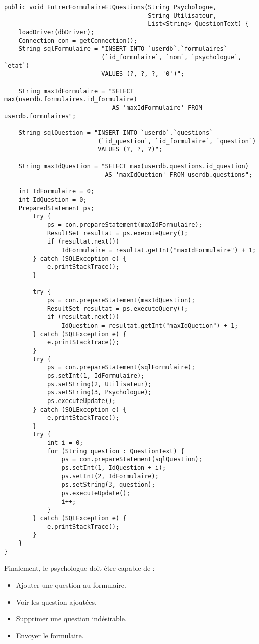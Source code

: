 \documentclass[12]{article}
\begin{document}
\begin{footnotesize}
\lstset{language=java}
\begin{lstlisting}
public void EntrerFormulaireEtQuestions(String Psychologue, 
										String Utilisateur, 
										List<String> QuestionText) {
	loadDriver(dbDriver);
	Connection con = getConnection();
	String sqlFormulaire = "INSERT INTO `userdb`.`formulaires` 
						   (`id_formulaire`, `nom`, `psychologue`, `etat`) 
						   VALUES (?, ?, ?, '0')";
						   
	String maxIdFormulaire = "SELECT max(userdb.formulaires.id_formulaire) 
							  AS 'maxIdFormulaire' FROM userdb.formulaires";
							  
	String sqlQuestion = "INSERT INTO `userdb`.`questions` 
						  (`id_question`, `id_formulaire`, `question`) 
						  VALUES (?, ?, ?)";
						  
	String maxIdQuestion = "SELECT max(userdb.questions.id_question) 
							AS 'maxIdQuetion' FROM userdb.questions";
							
	int IdFormulaire = 0;
	int IdQuestion = 0;
	PreparedStatement ps;
		try {
			ps = con.prepareStatement(maxIdFormulaire);
			ResultSet resultat = ps.executeQuery();
			if (resultat.next())
				IdFormulaire = resultat.getInt("maxIdFormulaire") + 1;
		} catch (SQLException e) {
			e.printStackTrace();
		}

		try {
			ps = con.prepareStatement(maxIdQuestion);
			ResultSet resultat = ps.executeQuery();
			if (resultat.next())
				IdQuestion = resultat.getInt("maxIdQuetion") + 1;
		} catch (SQLException e) {
			e.printStackTrace();
		}
		try {
			ps = con.prepareStatement(sqlFormulaire);
			ps.setInt(1, IdFormulaire);
			ps.setString(2, Utilisateur);
			ps.setString(3, Psychologue);
			ps.executeUpdate();
		} catch (SQLException e) {
			e.printStackTrace();
		}
		try {
			int i = 0;
			for (String question : QuestionText) {
				ps = con.prepareStatement(sqlQuestion);
				ps.setInt(1, IdQuestion + i);
				ps.setInt(2, IdFormulaire);
				ps.setString(3, question);
				ps.executeUpdate();
				i++;
			}
		} catch (SQLException e) {
			e.printStackTrace();
		}
	}
}

\end{lstlisting}
\end{footnotesize}





Finalement, le psychologue doit être capable de :\\
\begin{itemize}
\item Ajouter une question au formulaire.
\item Voir les question ajoutées.
\item Supprimer une question indésirable.
\item Envoyer le formulaire.
\end{itemize}
\end{document}
